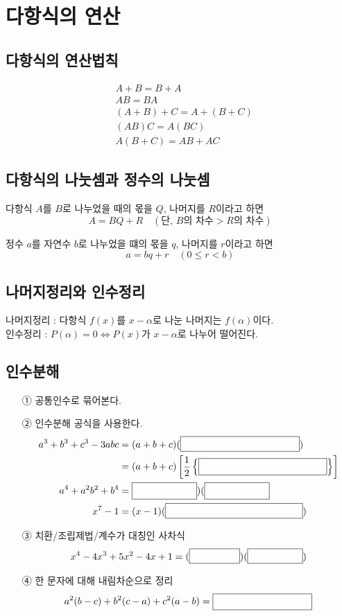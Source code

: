 \documentclass{oblivoir}
\newcommand\pb[1]{\ensuremath{\fbox{\phantom{#1}}}}
\newcounter{num}
\begin{document}
\section{다항식의 연산}
\subsection{다항식의 연산법칙}
\begin{align*}
&A+B=B+A 			\tag{덧셈의 교환법칙}\\
&AB=BA 				\tag{곱셈의 교환법칙}\\
&(A+B)+C=A+(B+C)	\tag{덧셈의 결합법칙}\\
&(AB)C=A(BC)		\tag{곱셈의 결합법칙}\\
&A(B+C)=AB+AC		\tag{분배법칙}
\end{align*}

\subsection{다항식의 나눗셈과 정수의 나눗셈}
다항식 \(A\)를 \(B\)로 나누었을 때의 몫을 \(Q\), 나머지를 \(R\)이라고 하면
\[A=BQ+R\quad(\text{단, }B\text{의 차수}>R\text{의 차수})\]

\noindent
정수 \(a\)를 자연수 \(b\)로 나누었을 떄의 몫을 \(q\), 나머지를 \(r\)이라고 하면
\[a=bq+r\quad(0\le r<b)\]


\subsection{나머지정리와 인수정리}
나머지정리 : 다항식 \(f(x)\)를 \(x-\alpha\)로 나눈 나머지는 \(f(\alpha)\)이다.\\
인수정리 : \(P(\alpha)=0\iff P(x)\)가 \(x-\alpha\)로 나누어 떨어진다.

\subsection{인수분해}
\begin{enumerate}
\item[①]
공통인수로 묶어본다.
\item[②]
인수분해 공식을 사용한다.
\begin{align*}
a^3+b^3+c^3-3abc
&=(a+b+c)(\pb{\(a^2+b^2+c^2-ab-bc-ca\)})\\
&=(a+b+c)\left[\frac12\left\{\pb{\((a-b)^2+(b-c)^2+(c-a)^2\)}\right\}\right]\\
a^4+a^2b^2+b^4&=\pb{\((a^2+ab+b^2)\)})(\pb{\((a^2-ab+b^2)\)}\\
x^7-1&=(x-1)(\pb{\(x^6+x^5+x^4+x^3+x^2+x+1\)})
\end{align*}
\item[③]
치환/조립제법/계수가 대칭인 사차식
\[x^4-4x^3+5x^2-4x+1=(\pb{\(x^2-x+1\)})(\pb{\(x^2-3x+1\)})\]
\item[④]
한 문자에 대해 내림차순으로 정리
\[a^2(b-c)+b^2(c-a)+c^2(a-b)=\pb{\(-(a-b)(b-c)(c-a)\)}\]
\end{enumerate}
\end{document}
